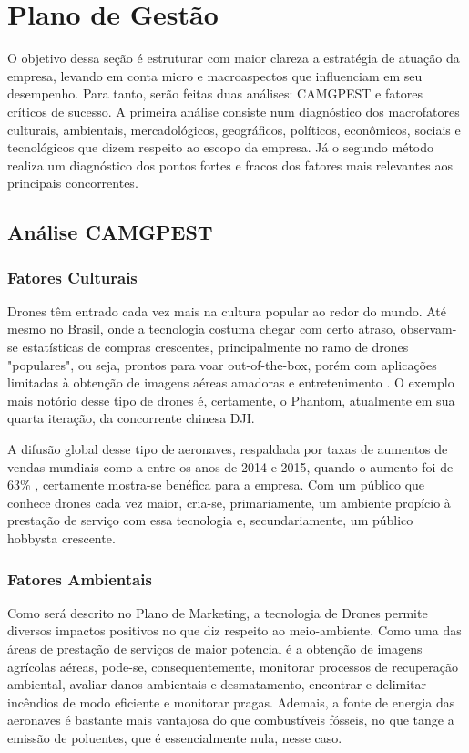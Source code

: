 \section{Plano de Gestão}

O objetivo dessa seção é estruturar com maior clareza a estratégia de atuação da empresa,
levando em conta micro e macroaspectos que influenciam em seu desempenho. Para tanto, serão 
feitas duas análises: CAMGPEST e fatores críticos de sucesso. A primeira análise consiste num 
diagnóstico dos macrofatores culturais, ambientais, mercadológicos, geográficos, políticos, 
econômicos, sociais e tecnológicos que dizem respeito ao escopo da empresa. Já o segundo método 
realiza um diagnóstico dos pontos fortes e fracos dos fatores mais relevantes aos principais 
concorrentes.

\subsection{Análise CAMGPEST}

\subsubsection*{Fatores Culturais}

Drones têm entrado cada vez mais na cultura popular ao redor do mundo. Até mesmo no Brasil, 
onde a tecnologia costuma chegar com certo atraso, observam-se estatísticas de compras crescentes, 
principalmente no ramo de drones "populares", ou seja, prontos para voar out-of-the-box, porém com 
aplicações limitadas à obtenção de imagens aéreas amadoras e entretenimento \cite{brasildrones}. 
O exemplo mais notório desse tipo de drones é, 
certamente, o Phantom, atualmente em sua quarta iteração, da concorrente chinesa DJI.

A difusão global desse tipo de aeronaves, respaldada por taxas de aumentos de vendas mundiais 
como a entre os anos de 2014 e 2015, quando o aumento foi de 63\% \cite{dronestats}, certamente 
mostra-se benéfica para a empresa. Com um público que conhece drones cada vez maior, cria-se, 
primariamente, um ambiente propício à prestação de serviço com essa tecnologia e, secundariamente, 
um público hobbysta crescente.

\subsubsection*{Fatores Ambientais}

Como será descrito no Plano de Marketing, a tecnologia de Drones permite diversos impactos positivos 
no que diz respeito ao meio-ambiente. Como uma das áreas de prestação de serviços de maior potencial 
é a obtenção de imagens agrícolas aéreas, pode-se, consequentemente, monitorar processos de recuperação 
ambiental, avaliar danos ambientais e desmatamento, encontrar e delimitar incêndios de modo eficiente e 
monitorar pragas. Ademais, a fonte de energia das aeronaves é bastante mais vantajosa do que combustíveis 
fósseis, no que tange a emissão de poluentes, que é essencialmente nula, nesse caso.

